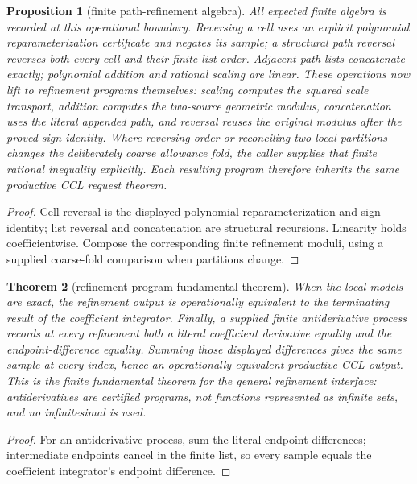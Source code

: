 \documentclass[10pt]{article}
\newtheorem{theorem}{Theorem}[section]
\newtheorem{proposition}[theorem]{Proposition}
\theoremstyle{definition}
\theoremstyle{remark}
\begin{document}
\begin{proposition}[finite path-refinement algebra]
All expected finite algebra is recorded at this operational boundary.
Reversing a cell uses an explicit polynomial reparameterization certificate
and negates its sample; a structural path reversal reverses both every cell
and their finite list order.  Adjacent path lists concatenate exactly;
polynomial addition and rational scaling are linear.  These operations now
lift to refinement programs themselves: scaling computes the squared scale
transport, addition computes the two-source geometric modulus, concatenation
uses the literal appended path, and reversal reuses the original modulus
after the proved sign identity.  Where reversing order or reconciling two
local partitions changes the deliberately coarse allowance fold, the caller
supplies that finite rational inequality explicitly.  Each resulting program
therefore inherits the same productive CCL request theorem.
\end{proposition}

\begin{proof}
Cell reversal is the displayed polynomial reparameterization and sign
identity; list reversal and concatenation are structural recursions.
Linearity holds coefficientwise.  Compose the corresponding finite
refinement moduli, using a supplied coarse-fold comparison when partitions
change.
\end{proof}

\begin{theorem}[refinement-program fundamental theorem]
When the local models are exact,
the refinement output is operationally equivalent to the terminating result
of the coefficient integrator.  Finally, a supplied finite antiderivative
process records at every refinement both a literal coefficient derivative
equality and the endpoint-difference equality.  Summing those displayed
differences gives the same sample at every index, hence an operationally
equivalent productive CCL output.  This is the finite fundamental theorem for
the general refinement interface: antiderivatives are certified programs,
not functions represented as infinite sets, and no infinitesimal is used.
\end{theorem}

\begin{proof}
For an antiderivative process, sum the literal endpoint differences;
intermediate endpoints cancel in the finite list, so every sample equals the
coefficient integrator's endpoint difference.
\end{proof}
\end{document}
